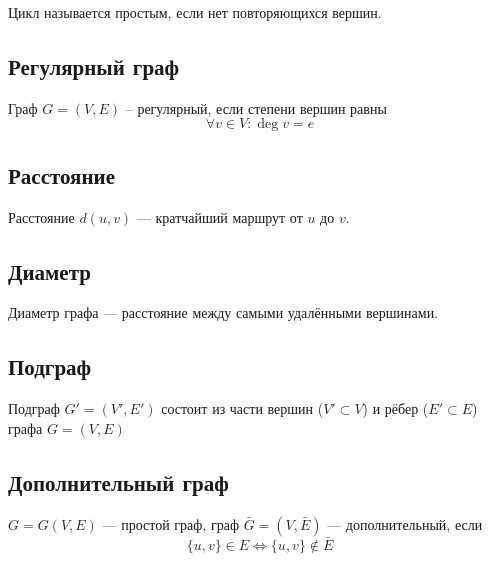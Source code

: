 \documentclass[a4paper,12pt]{article} %
\begin{document}
Цикл называется простым, если нет повторяющихся вершин.

\begin{center}
\end{center}
\subsection{Регулярный граф}
Граф $G = (V,E)$ -- регулярный, если степени вершин равны $$ \forall v \in V: \deg{v} = e$$

\subsection{Расстояние}

Расстояние $d(u,v)$ --- кратчайший маршрут от $u$ до $v$.

\subsection{Диаметр}

Диаметр графа --- расстояние между самыми удалёнными вершинами.

\subsection{Подграф}

Подграф $G' = (V',E')$ состоит из части вершин ($V' \subset V$) и рёбер ($E' 
\subset E$) графа $G = (V,E)$

\subsection{Дополнительный граф}

$G = G(V,E)$ --- простой граф, граф $\bar{G} = (V,\bar{E})$ --- дополнительный, если
$$ \{u,v\} \in E \Leftrightarrow \{u,v\} \notin \bar{E}$$
\end{document}
